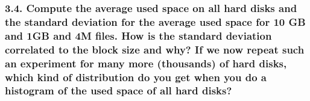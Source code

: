 \documentclass[11pt]{article}
\begin{document}
    \hypertarget{compute-the-average-used-space-on-all-hard-disks-and-the-standard-deviation-for-the-average-used-space-for-10-gb-and-1gb-and-4m-files.-how-is-the-standard-deviation-correlated-to-the-block-size-and-why-if-we-now-repeat-such-an-experiment-for-many-more-thousands-of-hard-disks-which-kind-of-distribution-do-you-get-when-you-do-a-histogram-of-the-used-space-of-all-hard-disks}{%
\subsubsection{3.4. Compute the average used space on all hard disks and
the standard deviation for the average used space for 10 GB and 1GB and
4M files. How is the standard deviation correlated to the block size and
why? If we now repeat such an experiment for many more (thousands) of
hard disks, which kind of distribution do you get when you do a
histogram of the used space of all hard
disks?}\label{compute-the-average-used-space-on-all-hard-disks-and-the-standard-deviation-for-the-average-used-space-for-10-gb-and-1gb-and-4m-files.-how-is-the-standard-deviation-correlated-to-the-block-size-and-why-if-we-now-repeat-such-an-experiment-for-many-more-thousands-of-hard-disks-which-kind-of-distribution-do-you-get-when-you-do-a-histogram-of-the-used-space-of-all-hard-disks}}
\end{document}
